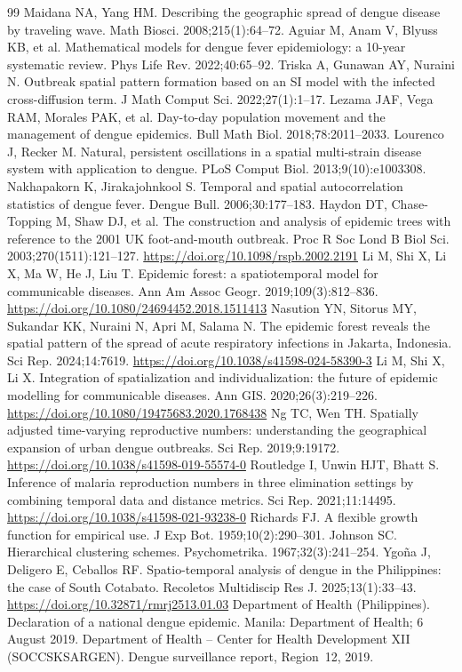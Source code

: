 \documentclass[a4paper,11pt]{article}
\begin{document}
\begin{thebibliography}{99}
 Maidana NA, Yang HM. Describing the geographic spread of dengue disease by traveling wave. Math Biosci. 2008;215(1):64--72.
 Aguiar M, Anam V, Blyuss KB, et al. Mathematical models for dengue fever epidemiology: a 10-year systematic review. Phys Life Rev. 2022;40:65--92.
 Triska A, Gunawan AY, Nuraini N. Outbreak spatial pattern formation based on an SI model with the infected cross-diffusion term. J Math Comput Sci. 2022;27(1):1--17.
 Lezama JAF, Vega RAM, Morales PAK, et al. Day-to-day population movement and the management of dengue epidemics. Bull Math Biol. 2018;78:2011--2033.
 Lourenco J, Recker M. Natural, persistent oscillations in a spatial multi-strain disease system with application to dengue. PLoS Comput Biol. 2013;9(10):e1003308.
 Nakhapakorn K, Jirakajohnkool S. Temporal and spatial autocorrelation statistics of dengue fever. Dengue Bull. 2006;30:177--183.
 Haydon DT, Chase-Topping M, Shaw DJ, et al. The construction and analysis of epidemic trees with reference to the 2001 UK foot-and-mouth outbreak. Proc R Soc Lond B Biol Sci. 2003;270(1511):121--127. \url{https://doi.org/10.1098/rspb.2002.2191}
 Li M, Shi X, Li X, Ma W, He J, Liu T. Epidemic forest: a spatiotemporal model for communicable diseases. Ann Am Assoc Geogr. 2019;109(3):812--836. \url{https://doi.org/10.1080/24694452.2018.1511413}
 Nasution YN, Sitorus MY, Sukandar KK, Nuraini N, Apri M, Salama N. The epidemic forest reveals the spatial pattern of the spread of acute respiratory infections in Jakarta, Indonesia. Sci Rep. 2024;14:7619. \url{https://doi.org/10.1038/s41598-024-58390-3}
 Li M, Shi X, Li X. Integration of spatialization and individualization: the future of epidemic modelling for communicable diseases. Ann GIS. 2020;26(3):219--226. \url{https://doi.org/10.1080/19475683.2020.1768438}
 Ng TC, Wen TH. Spatially adjusted time-varying reproductive numbers: understanding the geographical expansion of urban dengue outbreaks. Sci Rep. 2019;9:19172. \url{https://doi.org/10.1038/s41598-019-55574-0}
 Routledge I, Unwin HJT, Bhatt S. Inference of malaria reproduction numbers in three elimination settings by combining temporal data and distance metrics. Sci Rep. 2021;11:14495. \url{https://doi.org/10.1038/s41598-021-93238-0}
 Richards FJ. A flexible growth function for empirical use. J Exp Bot. 1959;10(2):290--301.
 Johnson SC. Hierarchical clustering schemes. Psychometrika. 1967;32(3):241--254.
 Ygo\~{n}a J, Deligero E, Ceballos RF. Spatio-temporal analysis of dengue in the Philippines: the case of South Cotabato. Recoletos Multidiscip Res J. 2025;13(1):33--43. \url{https://doi.org/10.32871/rmrj2513.01.03}
 Department of Health (Philippines). Declaration of a national dengue epidemic. Manila: Department of Health; 6 August 2019.
 Department of Health -- Center for Health Development XII (SOCCSKSARGEN). Dengue surveillance report, Region~12, 2019.
\end{thebibliography}
\end{document}
